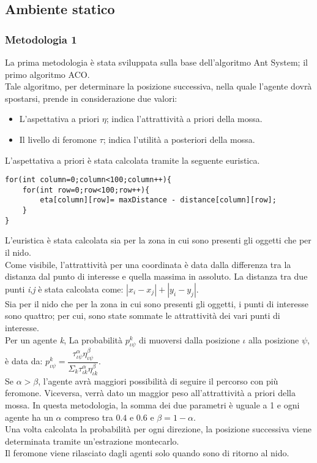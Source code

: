 \documentclass[12pt,a4paper,openright,twoside]{report}
\begin{document}
\subsection{Ambiente statico}

\subsubsection{Metodologia 1}

La prima metodologia è stata sviluppata sulla base dell'algoritmo Ant System; il primo algoritmo ACO.\\
Tale algoritmo, per determinare la posizione successiva, nella quale l'agente dovrà spostarsi, prende in considerazione due valori:

\begin{itemize}
	\item L'aspettativa a priori $\eta$; indica l'attrattività a priori della mossa.
	\item Il livello di feromone $\tau$; indica l'utilità a posteriori della mossa.
\end{itemize}

L'aspettativa a priori è stata calcolata tramite la seguente euristica. \\

\begin{verbatim}
for(int column=0;column<100;column++){
    for(int row=0;row<100;row++){
        eta[column][row]= maxDistance - distance[column][row];
    }
}
\end{verbatim}

L'euristica è stata calcolata sia per la zona in cui sono presenti gli oggetti che per il nido.\\
Come visibile, l'attrattività per una coordinata è data dalla differenza tra la distanza dal punto di interesse e quella massima in assoluto. La distanza tra due punti \textit{i},\textit{j} è stata calcolata come: $|x_i-x_j|+|y_i-y_j|$.\\
Sia per il nido che per la zona in cui sono presenti gli oggetti, i punti di interesse sono quattro; per cui, sono state sommate le attrattività dei vari punti di interesse.\\
Per un agente \textit{k}, La probabilità $p^k_{\iota\psi}$  di muoversi dalla posizione $\iota$ alla posizione $\psi$, è data da: $p^k_{\iota\psi}= \dfrac{\tau^\alpha_{\iota\psi}\eta^\beta_{\iota\psi}}{\Sigma_k\tau^\alpha_{\iota k}\eta^\beta_{\iota k}}$. \\
Se $\alpha>\beta$, l'agente avrà maggiori possibilità di seguire il percorso con più feromone. Viceversa, verrà dato un maggior peso all'attrattività a priori della mossa. In questa metodologia, la somma dei due parametri è uguale a 1 e ogni agente ha un $\alpha$ compreso tra $0.4$ e $0.6$ e $\beta=1-\alpha$.\\
Una volta calcolata la probabilità per ogni direzione, la posizione successiva viene determinata tramite un'estrazione montecarlo.\\
Il feromone viene rilasciato dagli agenti solo quando sono di ritorno al nido.\\\\
\end{document}
